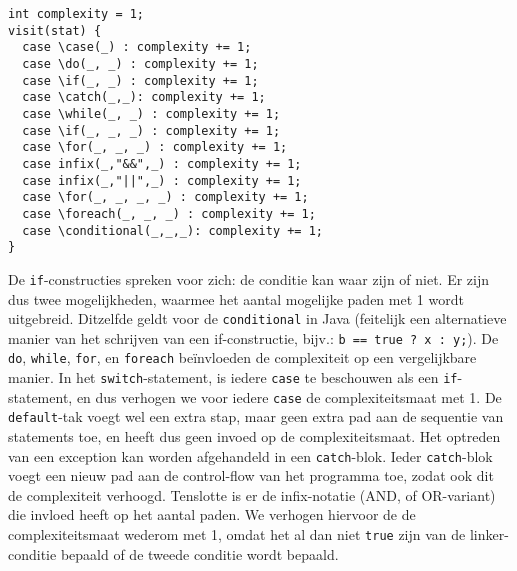 \documentclass[a4paper]{article}
\begin{document}
\begin{lstlisting}[caption={Taalsconstructies die de
complexiteit verhogen},label={lst:complexity},escapechar=|,
frame = single]
int complexity = 1;
visit(stat) {
  case \case(_) : complexity += 1;
  case \do(_, _) : complexity += 1;
  case \if(_, _) : complexity += 1;
  case \catch(_,_): complexity += 1;
  case \while(_, _) : complexity += 1;
  case \if(_, _, _) : complexity += 1;
  case \for(_, _, _) : complexity += 1;
  case infix(_,"&&",_) : complexity += 1;
  case infix(_,"||",_) : complexity += 1;    
  case \for(_, _, _, _) : complexity += 1;
  case \foreach(_, _, _) : complexity += 1;
  case \conditional(_,_,_): complexity += 1;
}
\end{lstlisting}

De \texttt{if}-constructies spreken voor zich: de conditie kan
waar zijn of niet. Er zijn dus twee mogelijkheden, waarmee het
aantal mogelijke paden met 1 wordt uitgebreid. Ditzelfde geldt
voor de \texttt{conditional} in Java (feitelijk een alternatieve
manier van het schrijven van een if-constructie, bijv.:
\texttt{b == true ? x : y;}). De \texttt{do}, \texttt{while},
\texttt{for}, en \texttt{foreach} be\"invloeden de complexiteit
op een vergelijkbare manier. In het \texttt{switch}-statement,
is iedere \texttt{case} te beschouwen als een
\texttt{if}-statement, en dus verhogen we voor iedere
\texttt{case} de complexiteitsmaat met 1.
De \texttt{default}-tak voegt wel een extra stap, maar geen
extra pad aan de sequentie van statements toe, en heeft dus geen
invoed op de complexiteitsmaat.
Het optreden van een exception kan worden afgehandeld in een
\texttt{catch}-blok. Ieder \texttt{catch}-blok voegt een nieuw
pad aan de control-flow van het programma toe, zodat ook dit de
complexiteit verhoogd.
Tenslotte is er de infix-notatie (AND, of OR-variant) die
invloed heeft op het aantal paden. We verhogen hiervoor de de
complexiteitsmaat wederom met 1, omdat het al dan niet
\texttt{true} zijn van de linker-conditie bepaald of de tweede
conditie wordt bepaald.
\end{document}
